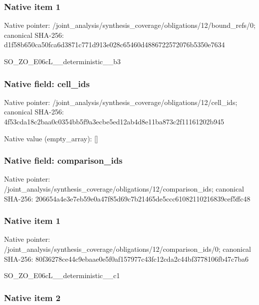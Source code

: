 \documentclass[10pt,a4paper]{article}
\begin{document}
\subsubsection{Native item 1}


Native pointer: /joint\_analysis/synthesi\allowbreak{}s\_coverage/obligations/1\allowbreak{}2/bound\_refs/0; canonical SHA-256: d1f58b650ca50fca6d3871c7\allowbreak{}71d913e028c65460d4886722\allowbreak{}572076b5350e7634


SO\_ZO\_E06cL\_\_deterministic\_\_b3


\subsubsection{Native field: cell\_ids}


Native pointer: /joint\_analysis/synthesi\allowbreak{}s\_coverage/obligations/1\allowbreak{}2/cell\_ids; canonical SHA-256: 4f53cda18c2baa0c0354bb5f\allowbreak{}9a3ecbe5ed12ab4d8e11ba87\allowbreak{}3c2f11161202b945



Native value (empty\_array): []



\subsubsection{Native field: comparison\_ids}


Native pointer: /joint\_analysis/synthesi\allowbreak{}s\_coverage/obligations/1\allowbreak{}2/comparison\_ids; canonical SHA-256: 206654a4e3e7eb59e0a47f85\allowbreak{}d69c7b21465de5ccc6108211\allowbreak{}0216839cef5ffc48



\subsubsection{Native item 1}


Native pointer: /joint\_analysis/synthesi\allowbreak{}s\_coverage/obligations/1\allowbreak{}2/comparison\_ids/0; canonical SHA-256: 80f36278ce44c9ebaae0e5f0\allowbreak{}af157977c43fc12cda2c44bf\allowbreak{}3778106fb47c7ba6


SO\_ZO\_E06cL\_\_deterministic\_\_c1


\subsubsection{Native item 2}
\end{document}

